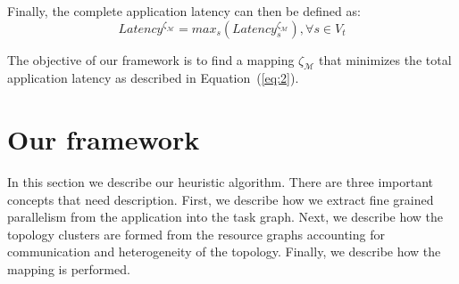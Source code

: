 \documentclass[10pt, conference, compsocconf]{IEEEtran}
\begin{document}
Finally, the complete application latency can then be defined as: 
\begin{equation}
  \label{eq:2}
  Latency^{\zeta_\mathcal{M}} = max_{s}
  ({Latency^{\zeta_\mathcal{M}}_s}), \forall s \in V_t
\end{equation}

The objective of our framework is to find a mapping $\zeta_\mathcal{M}$
that minimizes the total application latency as described in
Equation~(\ref{eq:2}).


\section{Our framework}
\label{sec:our-framework}

In this section we describe our heuristic algorithm. There are three
important concepts that need description. First, we describe how we
extract fine grained parallelism from the application into the task
graph. Next, we describe how the topology clusters are formed from the
resource graphs accounting for communication and heterogeneity of the
topology. Finally, we describe how the mapping is performed.


\end{document}
